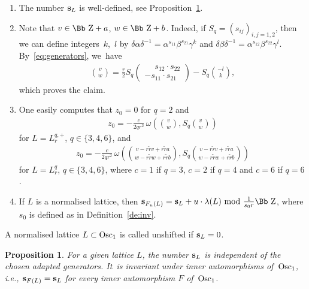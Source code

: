 \documentclass[pdftex]{sigma}
\newcommand\ZZ{{\mbox{\Bb Z}}}
\newcommand\bs{\textbf{{\rm \textbf{s}}}}
\newcommand{\Osc}{{\rm Osc}}
\newcommand{\benur}{\begin{enumerate}[label=$(\roman*)$]\itemsep=0pt}
\numberwithin{equation}{section}
\newtheorem{Proposition}[Theorem]{Proposition}
 { \theoremstyle{definition}
\newtheorem{Definition}[Theorem]{Definition}
\newtheorem{Note}[Theorem]{Note}
\newtheorem{Example}[Theorem]{Example}
\newtheorem{Remark}[Theorem]{Remark} }
\begin{document}
\begin{Remark}\label{rm4}\quad
\benur
\item The number $\bs_L$ is well-defined, see Proposition~\ref{scorrect}.
 \item %
 Note that $v\in\ZZ+a$, $w\in\ZZ+b$. Indeed, if $S_q=(s_{ij})_{i,j=1,2}$, then we can define inte\-gers~$k$,~$l$ by $\delta \alpha\delta^{-1}=\alpha^{s_{11}}\beta^{s_{21}}\gamma^k$ and $\delta \beta\delta^{-1}=\alpha^{s_{12}}\beta^{s_{22}}\gamma^l$. By~\eqref{eq:generators}, we~have
\begin{gather}\label{klvw}
 {v\choose w}=\frac r2 S_q \begin{pmatrix}\phantom{-}s_{12}\cdot s_{22}\\[0.5ex] -s_{11}\cdot s_{21}\end{pmatrix} -S_q{-l\choose k},
\end{gather}
which proves the claim.
\item%
One easily computes that $z_0=0$ for $q=2$ and
\begin{gather*}
z_0= -\frac{c}{2qr^2}\, \omega\left(\!{v \choose w},S_q{v \choose w}\!\right)
\end{gather*}
for $L=L^{q,+}_r$, $q\in\{3,4,6\}$, and
\begin{gather*}
z_0=-\frac{c}{2qr^2}\, \omega\left(\!{v-r\tilde rv+r\tilde ra\choose w-r\tilde rw+r\tilde rb},S_q{v-r\tilde rv+r\tilde ra\choose w-r\tilde rw+r\tilde rb}\!\right)
\end{gather*}
for $L=L^{q}_r$, $q\in\{3,4,6\}$, where $c=1$ if $q=3$, $c=2$ if $q=4$ and $c=6$ if $q=6$.
\item If $L$ is a normalised lattice, then $\bs_{F_u(L)}=\bs_L+u\cdot\lambda(L)\ {\rm mod}\ \frac1{s_0r}\ZZ$, where $s_0$ is defined as in Definition~\ref{de:inv}.
\end{enumerate}
\end{Remark}
%
\begin{Definition} A normalised lattice $L\subset\Osc_1$ is called unshifted if $\bs_L=0$.
\end{Definition}
%
\begin{Proposition}\label{scorrect}
For a given lattice $L$, the number $\bs_L$ is independent of the chosen adapted generators. It~is invariant under inner automorphisms of~$\Osc_1$, i.e., $\bs_{F(L)}=\bs_L$ for every inner automorphism $F$ of~$\Osc_1$.
\end{Proposition}
\end{document}
